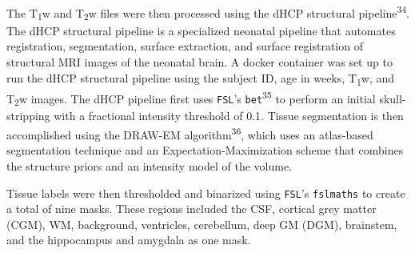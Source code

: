\documentclass[
  letterpaper,
  DIV=11,
  numbers=noendperiod]{scrartcl}
\begin{document}
The T\textsubscript{1}w and T\textsubscript{2}w files were then
processed using the dHCP structural pipeline\textsuperscript{34}. The
dHCP structural pipeline is a specialized neonatal pipeline that
automates registration, segmentation, surface extraction, and surface
registration of structural MRI images of the neonatal brain. A docker
container was set up to run the dHCP structural pipeline using the
subject ID, age in weeks, T\textsubscript{1}w, and T\textsubscript{2}w
images. The dHCP pipeline first uses \texttt{FSL}'s
\texttt{bet}\textsuperscript{35} to perform an initial skull-stripping
with a fractional intensity threshold of 0.1. Tissue segmentation is
then accomplished using the DRAW-EM algorithm\textsuperscript{36}, which
uses an atlas-based segmentation technique and an
Expectation-Maximization scheme that combines the structure priors and
an intensity model of the volume.

Tissue labels were then thresholded and binarized using \texttt{FSL}'s
\texttt{fslmaths} to create a total of nine masks. These regions
included the CSF, cortical grey matter (CGM), WM, background,
ventricles, cerebellum, deep GM (DGM), brainstem, and the hippocampus
and amygdala as one mask.
\end{document}
